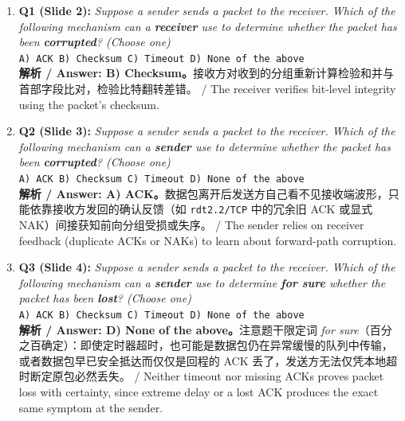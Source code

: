 \begin{enumerate}
\item \textbf{Q1 (Slide 2):} \emph{Suppose a sender sends a packet to the receiver. Which of the following mechanism can a \textbf{receiver} use to determine whether the packet has been \textbf{corrupted}? (Choose one)} \\
\texttt{A) ACK \quad B) Checksum \quad C) Timeout \quad D) None of the above} \\
\textbf{解析 / Answer: B) Checksum。}接收方对收到的分组重新计算检验和并与首部字段比对，检验比特翻转差错。 / The receiver verifies bit-level integrity using the packet's checksum.

\item \textbf{Q2 (Slide 3):} \emph{Suppose a sender sends a packet to the receiver. Which of the following mechanism can a \textbf{sender} use to determine whether the packet has been \textbf{corrupted}? (Choose one)} \\
\texttt{A) ACK \quad B) Checksum \quad C) Timeout \quad D) None of the above} \\
\textbf{解析 / Answer: A) ACK。}数据包离开后发送方自己看不见接收端波形，只能依靠接收方发回的确认反馈（如 \texttt{rdt2.2/TCP} 中的冗余旧 ACK 或显式 NAK）间接获知前向分组受损或失序。 / The sender relies on receiver feedback (duplicate ACKs or NAKs) to learn about forward-path corruption.

\item \textbf{Q3 (Slide 4):} \emph{Suppose a sender sends a packet to the receiver. Which of the following mechanism can a \textbf{sender} use to determine \textbf{for sure} whether the packet has been \textbf{lost}? (Choose one)} \\
\texttt{A) ACK \quad B) Checksum \quad C) Timeout \quad D) None of the above} \\
\textbf{解析 / Answer: D) None of the above。}注意题干限定词 \emph{for sure}（百分之百确定）：即使定时器超时，也可能是数据包仍在异常缓慢的队列中传输，或者数据包早已安全抵达而仅仅是回程的 ACK 丢了，发送方无法仅凭本地超时断定原包必然丢失。 / Neither timeout nor missing ACKs proves packet loss with certainty, since extreme delay or a lost ACK produces the exact same symptom at the sender.


\end{enumerate}
